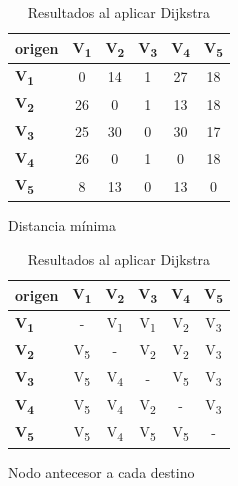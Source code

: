 \documentclass[../tp2_grupo404.tex]{subfiles}
\begin{document}
\begin{table}[H]
\begin{subtable}[H]{0.45\textwidth}
    \centering
    \begin{tabular}{@{}lccccc@{}}
    \toprule
    \textbf{origen} & \textbf{V\textsubscript{1}} & \textbf{V\textsubscript{2}} & \textbf{V\textsubscript{3}} & \textbf{V\textsubscript{4}} & \textbf{V\textsubscript{5}} \\ \midrule
    \textbf{V\textsubscript{1}}  & 0   & 14  & 1  & 27  & 18  \\
    \textbf{V\textsubscript{2}}  & 26  & 0   & 1  & 13  & 18  \\
    \textbf{V\textsubscript{3}}  & 25  & 30  & 0  & 30  & 17  \\
    \textbf{V\textsubscript{4}}  & 26  & 0   & 1  & 0   & 18  \\
    \textbf{V\textsubscript{5}}  & 8   & 13  & 0  & 13  & 0   \\ \bottomrule
    \end{tabular}
    \caption{Distancia mínima}
    \label{DijkstraGrafoHMinimos}
\end{subtable}
\hfill
\begin{subtable}[H]{0.45\textwidth}
    \centering
    \begin{tabular}{@{}lccccc@{}}
    \toprule
    \textbf{origen} & \textbf{V\textsubscript{1}} & \textbf{V\textsubscript{2}} & \textbf{V\textsubscript{3}} & \textbf{V\textsubscript{4}} & \textbf{V\textsubscript{5}} \\ \midrule
    \textbf{V\textsubscript{1}}  & -                   & V\textsubscript{1}  & V\textsubscript{1}  & V\textsubscript{2}  & V\textsubscript{3}  \\
    \textbf{V\textsubscript{2}}  & V\textsubscript{5}  & -                   & V\textsubscript{2}  & V\textsubscript{2}  & V\textsubscript{3}  \\
    \textbf{V\textsubscript{3}}  & V\textsubscript{5}  & V\textsubscript{4}  & -                   & V\textsubscript{5}  & V\textsubscript{3}  \\
    \textbf{V\textsubscript{4}}  & V\textsubscript{5}  & V\textsubscript{4}  & V\textsubscript{2}  & -                   & V\textsubscript{3}  \\
    \textbf{V\textsubscript{5}}  & V\textsubscript{5}  & V\textsubscript{4}  & V\textsubscript{5}  & V\textsubscript{5}  & -                   \\ \bottomrule
    \end{tabular}
    \caption{Nodo antecesor a cada destino}
    \label{DijkstraGrafoHAntecesor}
    \end{subtable}
\caption{Resultados al aplicar Dijkstra}
\label{DijkstraGrafoH}
\end{table}
\end{document}
